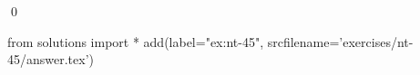 
\begin{ex} 
  \label{ex:nt-45}
  
  \qed
\end{ex} 
\begin{python0}
from solutions import *
add(label="ex:nt-45",
    srcfilename='exercises/nt-45/answer.tex') 
\end{python0}
